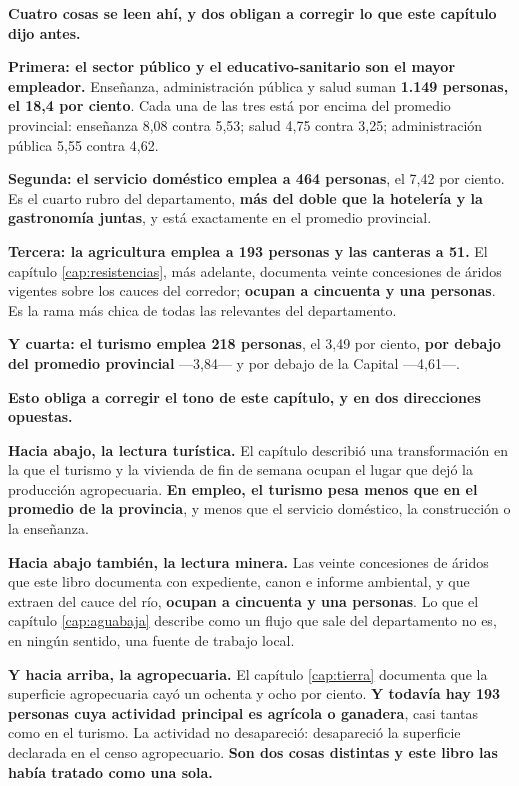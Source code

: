 \textbf{Cuatro cosas se leen ahí, y dos obligan a corregir lo que este capítulo dijo antes.}

\textbf{Primera: el sector público y el educativo-sanitario son el mayor empleador.} Enseñanza,
administración pública y salud suman \textbf{1.149 personas, el 18,4 por ciento}. Cada una de
las tres está por encima del promedio provincial: enseñanza 8,08 contra 5,53; salud 4,75 contra
3,25; administración pública 5,55 contra 4,62.

\textbf{Segunda: el servicio doméstico emplea a 464 personas}, el 7,42 por ciento. Es el cuarto
rubro del departamento, \textbf{más del doble que la hotelería y la gastronomía juntas}, y está
exactamente en el promedio provincial.

\textbf{Tercera: la agricultura emplea a 193 personas y las canteras a 51.} El capítulo
\ref{cap:resistencias}, más adelante, documenta veinte concesiones de áridos vigentes sobre los cauces del
corredor; \textbf{ocupan a cincuenta y una personas}. Es la rama más chica de todas las
relevantes del departamento.

\textbf{Y cuarta: el turismo emplea 218 personas}, el 3,49 por ciento, \textbf{por debajo del
promedio provincial} ---3,84--- y por debajo de la Capital ---4,61---.

\begin{cautela}
\textbf{Esto obliga a corregir el tono de este capítulo, y en dos direcciones opuestas.}

\textbf{Hacia abajo, la lectura turística.} El capítulo describió una transformación en la que
el turismo y la vivienda de fin de semana ocupan el lugar que dejó la producción agropecuaria.
\textbf{En empleo, el turismo pesa menos que en el promedio de la provincia}, y menos que el
servicio doméstico, la construcción o la enseñanza.

\textbf{Hacia abajo también, la lectura minera.} Las veinte concesiones de áridos que este
libro documenta con expediente, canon e informe ambiental, y que extraen del cauce del río,
\textbf{ocupan a cincuenta y una personas}. Lo que el capítulo \ref{cap:aguabaja} describe como
un flujo que sale del departamento no es, en ningún sentido, una fuente de trabajo local.

\textbf{Y hacia arriba, la agropecuaria.} El capítulo \ref{cap:tierra} documenta que la
superficie agropecuaria cayó un ochenta y ocho por ciento. \textbf{Y todavía hay 193 personas
cuya actividad principal es agrícola o ganadera}, casi tantas como en el turismo. La actividad
no desapareció: desapareció la superficie declarada en el censo agropecuario. \textbf{Son dos
cosas distintas y este libro las había tratado como una sola.}
\end{cautela}

